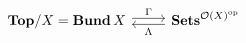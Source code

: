 \documentclass{article}
\newcommand{\cat}[1]{\mathbf{#1}}
\newcommand{\op}{\mathrm{op}}
\begin{document}
\begin{equation*}
\begin{tikzcd}
\cat{Top}/X = \cat{Bund}\,X \arrow[r,shift left=.5ex,"\Gamma"]
&
\cat{Sets}^{\mathcal{O}(X)^{\op}} \arrow[l,shift left=.5ex,"\Lambda"]
\end{tikzcd}
\end{equation*}
\end{document}
